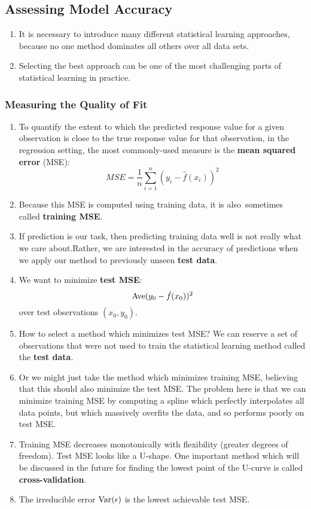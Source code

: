 \documentclass[10pt]{article}
\newcommand{\fhat}{\hat{f}}
\begin{document}
\vspace{.2in} 

\subsection{Assessing Model Accuracy} 
\begin{enumerate}
	\item It is necessary to introduce many different statistical learning approaches, because no one method dominates all others over all data sets.
	\item Selecting the best approach can be one of the most challenging parts of statistical learning in practice.
\end{enumerate}

\vspace{.2in} 

\subsubsection{Measuring the Quality of Fit} 
\begin{enumerate}
	\item To quantify the extent to which the predicted response value for a given observation is close to the true response value for that observation, in the regression setting, the most commonly-used measure is the \textbf{mean squared error} (MSE):
	$$MSE = \dfrac{1}{n} \sum_{i = 1}^n (y_i - \fhat(x_i))^2 $$
	\item Because this MSE is computed using training data, it is also\ sometimes called \textbf{training MSE}.
	\item If prediction is our task, then predicting training data well is not really what we care about.Rather, we are interested in the accuracy of predictions when we apply our method to previously unseen \textbf{test data}.
	\item We want to minimize \textbf{test MSE}:
	$${\rm Ave}(y_0 - \fhat(x_0))^2$$
	over test observations $(x_0, y_0)$.
	\item How to select a method which minimizes test MSE?  We can reserve a set of observations that were not used to train the statistical learning method called the \textbf{test data}. 
	\item Or we might just take the method which minimizes training MSE, believing that this should also minimize the test MSE.  The problem here is that we can minimize training MSE by computing a spline which perfectly interpolates all data points, but which massively overfits the data, and so performs poorly on test MSE.
	\item Training MSE decreases monotonically with flexibility (greater degrees of freedom).  Test MSE looks like a U-shape.  One important method which will be discussed in the future for finding the lowest point of the U-curve is called \textbf{cross-validation}. 
	\item The irreducible error ${\rm Var}(\epsilon)$ is the lowest achievable test MSE.
\end{enumerate}
\end{document}
